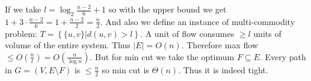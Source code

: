 If we take $l = \log_{2} \frac{n-2}{6} + 1$ so with the upper bound we get $1 + 3 \cdot \frac{n-2}{6} = 1 + \frac{n-2}{2} = \frac{n}{2}$. And also we define an instance of multi-commodity problem: $T = \left\{\{u,v\} | d(u,v) > l\right\}$. A unit of flow consumes $\geq l$ units of volume of the entire system. Thus $|E| = O(n)$. Therefore max flow $\leq O(\frac{n}{l}) = O(\frac{n}{\log n})$. But for min cut we take the optimum $F \subseteq E$. Every path in $G = (V, E \setminus F)$ is $\leq \frac{n}{2}$ so min cut is $\Theta(n)$. Thus it is indeed tight.